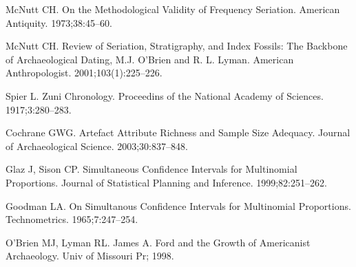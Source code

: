 \documentclass[10pt,letterpaper]{article}
\begin{document}
\begin{thebibliography}{10}
McNutt CH.
\newblock On the Methodological Validity of Frequency Seriation.
\newblock American Antiquity. 1973;38:45--60.

McNutt CH.
\newblock Review of Seriation, Stratigraphy, and Index Fossils: The Backbone of
  Archaeological Dating, M.J. O'Brien and R. L. Lyman.
\newblock American Anthropologist. 2001;103(1):225--226.

Spier L.
\newblock Zuni Chronology.
\newblock Proceedins of the National Academy of Sciences. 1917;3:280--283.

Cochrane GWG.
\newblock Artefact Attribute Richness and Sample Size Adequacy.
\newblock Journal of Archaeological Science. 2003;30:837--848.

Glaz J, Sison CP.
\newblock Simultaneous Confidence Intervals for Multinomial Proportions.
\newblock Journal of Statistical Planning and Inference. 1999;82:251--262.

Goodman LA.
\newblock On Simultanous Confidence Intervals for Multinomial Proportions.
\newblock Technometrics. 1965;7:247--254.

O'Brien MJ, Lyman RL.
\newblock James A. Ford and the Growth of Americanist Archaeology.
\newblock Univ of Missouri Pr; 1998.

\end{thebibliography}
\end{document}
